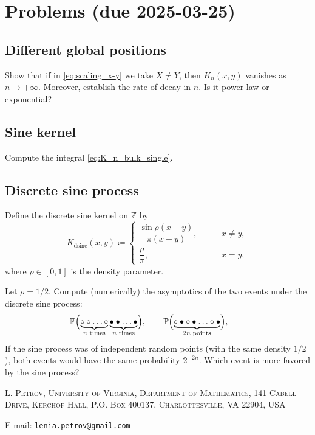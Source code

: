 \documentclass[letterpaper,11pt,oneside,reqno]{article}
\numberwithin{equation}{section}
\theoremstyle{definition}
\begin{document}
\appendix
\setcounter{section}{5}

\section{Problems (due 2025-03-25)}

\subsection{Different global positions}
\label{prob:different-global-positions}

Show that if in \eqref{eq:scaling_x-y} we take $X\ne Y$, then
$K_n(x,y)$ vanishes as $n\to+\infty$. Moreover,
establish the rate of decay in $n$. Is it power-law or exponential?

\subsection{Sine kernel}
\label{prob:sine-kernel}

Compute the integral
\eqref{eq:K_n_bulk_single}.


\subsection{Discrete sine process}
\label{prob:discrete-sine-process}

Define the discrete sine kernel on $\mathbb{Z}$ by
\begin{equation*}
	K_{\mathrm{dsine}}(x,y)\coloneqq
	\begin{cases}
		\dfrac{\sin \rho(x-y)}{\pi (x-y)},&\qquad x\ne y,\\[10pt]
		\dfrac{\rho}{\pi},&\qquad x=y,
	\end{cases}
\end{equation*}
where $\rho\in[0,1]$ is the density parameter.

Let $\rho=1/2$.
Compute (numerically) the asymptotics of the two events under the discrete sine process:
\begin{equation*}
	\operatorname{\mathbb{P}}
	\Bigl(
		\underbrace{\circ \circ\ldots\circ}_{n\text{ times}}
		\underbrace{\bullet \bullet\ldots\bullet}_{n\text{ times}}
	\Bigr),\qquad
	\operatorname{\mathbb{P}}
	\Bigl(
		\underbrace{\circ\bullet\circ\bullet\ldots\circ\bullet}_{2n\text{ points}}
	\Bigr),\qquad
\end{equation*}
If the sine process was of independent random points (with the same density $1/2$),
both events
would have the same probability $2^{-2n}$.
Which event is more favored by the sine process?









\medskip

\textsc{L. Petrov, University of Virginia, Department of Mathematics, 141 Cabell Drive, Kerchof Hall, P.O. Box 400137, Charlottesville, VA 22904, USA}

E-mail: \texttt{lenia.petrov@gmail.com}
\end{document}
